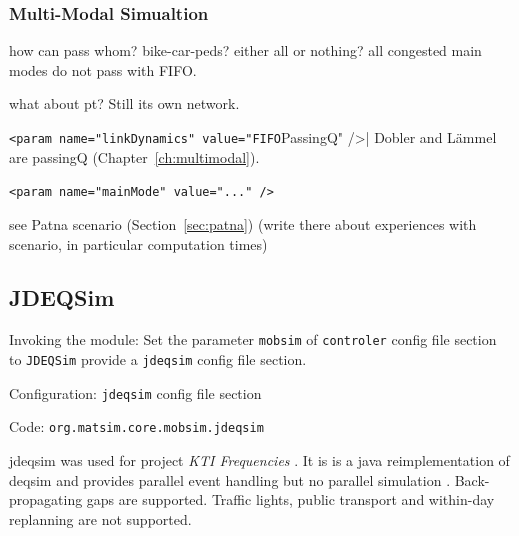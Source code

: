 \subsubsection{Multi-Modal Simualtion}
\label{sec:multimodalsim_qsim}

how can pass whom? bike-car-peds? either all or nothing? all congested main modes do not pass with FIFO.

what about pt? Still its own network.

\lstinline|<param name="linkDynamics" value="FIFO|PassingQ" />|
Dobler and Lämmel are passingQ (Chapter~\ref{ch:multimodal}).

\lstinline|<param name="mainMode" value="..." />|


see Patna scenario (Section~\ref{sec:patna}) (write there about experiences with scenario, in particular computation times)

\subsection{JDEQSim}
\label{sec:jdeqsim}
\begin{compactitem}
\item Invoking the module: Set the parameter \lstinline|mobsim| of \lstinline|controler| config file section to \lstinline|JDEQSim| provide a \lstinline|jdeqsim| config file section.
\item Configuration: \lstinline|jdeqsim| config file section
\item Code: \lstinline|org.matsim.core.mobsim.jdeqsim|
\end{compactitem}

\gls{jdeqsim} \citep[][]{WaraichEtAl_TechRep_IVT_2009, WaraichEtAl_STRC_2009} was used for project \emph{KTI Frequencies} \citep[][]{BalmerEtAl_ResRep_datapuls_2010}. It is is a \gls{java} reimplementation of \gls{deqsim} \citep[][]{WaraichEtAl_STRC_2009, CharyparEtAl_TRR_2007, CharyparEtAl_TRB_2009} and provides parallel event handling but no parallel simulation \citep[][p.11]{BalmerEtAl_ResRep_datapuls_2010}. Back-propagating gaps are supported. Traffic lights, public transport and within-day replanning are not supported.

